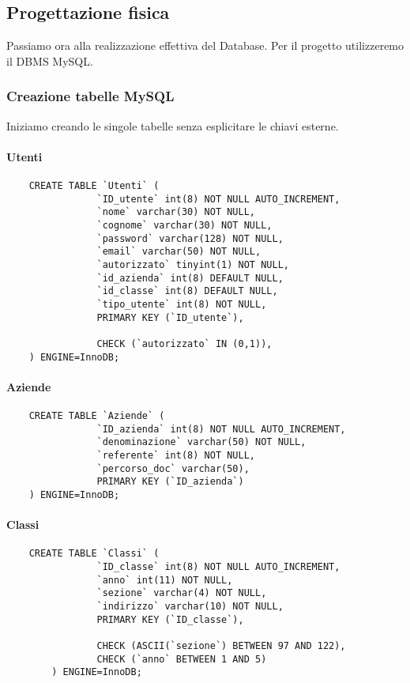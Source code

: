 \documentclass[12pt]{article}
\begin{document}
\newpage
\subsection{Progettazione fisica}
Passiamo ora alla realizzazione effettiva del Database. Per il progetto utilizzeremo il DBMS MySQL.
\subsubsection{Creazione tabelle MySQL}
Iniziamo creando le singole tabelle senza esplicitare le chiavi esterne.
\paragraph{Utenti}
\begin{verbatim}
    CREATE TABLE `Utenti` (
    		    `ID_utente` int(8) NOT NULL AUTO_INCREMENT,
        		`nome` varchar(30) NOT NULL,
        		`cognome` varchar(30) NOT NULL,
        		`password` varchar(128) NOT NULL,
        		`email` varchar(50) NOT NULL,
        		`autorizzato` tinyint(1) NOT NULL,
        		`id_azienda` int(8) DEFAULT NULL,
        		`id_classe` int(8) DEFAULT NULL,
        		`tipo_utente` int(8) NOT NULL,
        		PRIMARY KEY (`ID_utente`),
        		
        		CHECK (`autorizzato` IN (0,1)),
    ) ENGINE=InnoDB;
\end{verbatim}

\newpage
\paragraph{Aziende}
\begin{verbatim}
    CREATE TABLE `Aziende` (
        		`ID_azienda` int(8) NOT NULL AUTO_INCREMENT,
        		`denominazione` varchar(50) NOT NULL,
        		`referente` int(8) NOT NULL,
        		`percorso_doc` varchar(50),
        		PRIMARY KEY (`ID_azienda`)
    ) ENGINE=InnoDB;
\end{verbatim}

\paragraph{Classi}
\begin{verbatim}
    CREATE TABLE `Classi` (
        		`ID_classe` int(8) NOT NULL AUTO_INCREMENT,
        		`anno` int(11) NOT NULL,
        		`sezione` varchar(4) NOT NULL,
        		`indirizzo` varchar(10) NOT NULL,
        		PRIMARY KEY (`ID_classe`),
        		
        		CHECK (ASCII(`sezione`) BETWEEN 97 AND 122),
        		CHECK (`anno` BETWEEN 1 AND 5)
	    ) ENGINE=InnoDB;
\end{verbatim}
\end{document}

